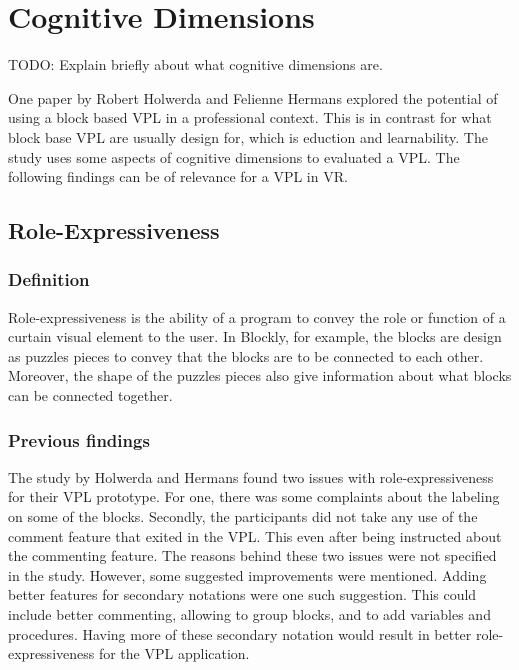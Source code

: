 \documentclass{sigchi}
\begin{document}
\section{Cognitive Dimensions}
TODO: Explain briefly about what cognitive dimensions are.

One paper by Robert Holwerda and Felienne Hermans explored the potential of using a block based VPL in a professional context. This is in contrast for what block base VPL are usually design for, which is eduction and learnability. The study uses some aspects of cognitive dimensions to evaluated a VPL. The following findings can be of relevance for a VPL in VR.

\subsection{Role-Expressiveness}
\subsubsection{Definition}
Role-expressiveness is the ability of a program to convey the role or function of a curtain visual element to the user. In Blockly, for example, the blocks are design as puzzles pieces to convey that the blocks are to be connected to each other. Moreover, the shape of the puzzles pieces also give information about what blocks can be connected together.

\subsubsection{Previous findings}
The study by Holwerda and Hermans found two issues with role-expressiveness for their VPL prototype. For one, there was some complaints about the labeling on some of the blocks. Secondly, the participants did not take any use of the comment feature that exited in the VPL. This even after being instructed about the commenting feature. The reasons behind these two issues were not specified in the study. However, some suggested improvements were mentioned. Adding better features for secondary notations were one such suggestion. This could include better commenting, allowing to group blocks, and to add variables and procedures. Having more of these secondary notation would result in better role-expressiveness for the VPL application.
\end{document}
